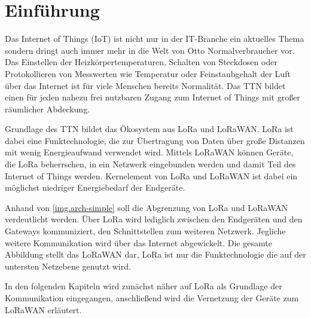 \chapter{Einführung}
Das Internet of Things (IoT) ist nicht nur in der IT-Branche ein aktuelles Thema sondern dringt auch immer mehr in die Welt von Otto Normalverbraucher vor.
Das Einstellen der Heizkörpertemperaturen, Schalten von Steckdosen oder Protokollieren von Messwerten wie Temperatur oder Feinstaubgehalt der Luft über das Internet ist für viele Menschen bereits Normalität.
Das \gls{TTN} bildet einen für jeden nahezu frei nutzbaren Zugang zum Internet of Things mit großer räumlicher Abdeckung.

Grundlage des TTN bildet das Ökosystem aus LoRa und LoRaWAN.
LoRa ist dabei eine Funktechnologie, die zur Übertragung von Daten über große Distanzen mit wenig Energieaufwand verwendet wird. 
Mittels LoRaWAN können Geräte, die LoRa beherrschen, in ein Netzwerk eingebunden werden und damit Teil des Internet of Things werden.
Kernelement von LoRa und LoRaWAN ist dabei ein möglichst niedriger Energiebedarf der Endgeräte.

Anhand von \autoref{img.arch-simple} soll die Abgrenzung von LoRa und LoRaWAN verdeutlicht werden.
Über LoRa wird lediglich zwischen den Endgeräten und den Gateways kommuniziert, den Schnittstellen zum weiteren Netzwerk.
Jegliche weitere Kommunikation wird über das Internet abgewickelt.
Die gesamte Abbildung stellt das LoRaWAN dar, LoRa ist nur die Funktechnologie die auf der untersten Netzebene genutzt wird.

In den folgenden Kapiteln wird zunächst näher auf LoRa als Grundlage der Kommunikation eingegangen, anschließend wird die Vernetzung der Geräte zum LoRaWAN erläutert.
